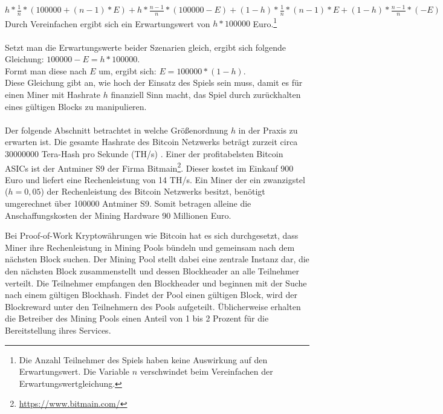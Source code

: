 $h*\frac{1}{n}*(100000 + (n-1)*E) + h*\frac{n-1}{n}*(100000 - E) + (1-h)*\frac{1}{n}*(n-1)*E + (1-h)*\frac{n-1}{n}* (-E)$\\
Durch Vereinfachen ergibt sich ein Erwartungswert von $ h*100000$ Euro.\footnote{Die Anzahl Teilnehmer des Spiels haben keine Auswirkung auf den Erwartungswert. Die Variable $n$ verschwindet beim Vereinfachen der Erwartungswertgleichung.}\\\\
Setzt man die Erwartungswerte beider Szenarien gleich, ergibt sich folgende Gleichung: $100000 - E = h*100000$.\\Formt man diese nach $E$ um, ergibt sich: $E = 100000 * (1-h)$.\\
Diese Gleichung gibt an, wie hoch der Einsatz des Spiels sein muss, damit es für einen Miner mit Hashrate $h$ finanziell Sinn macht, das Spiel durch zurückhalten eines gültigen Blocks zu manipulieren.\\\\
Der folgende Abschnitt betrachtet in welche Größenordnung $h$ in der Praxis zu erwarten ist.
Die gesamte Hashrate des Bitcoin Netzwerks beträgt zurzeit circa 30000000 Tera-Hash pro Sekunde (TH/s) \cite{blockchain_info_hashrate}. Einer der profitabelsten Bitcoin ASICs ist der Antminer S9 der Firma Bitmain\footnote{\url{https://www.bitmain.com/}}. Dieser kostet im Einkauf 900 Euro und liefert eine Rechenleistung von 14 TH/s. Ein Miner der ein zwanzigstel ($h=0,05$) der Rechenleistung des Bitcoin Netzwerks besitzt, benötigt umgerechnet über 100000 Antminer S9. Somit betragen alleine die Anschaffungskosten der Mining Hardware 90 Millionen Euro.

Bei Proof-of-Work Kryptowährungen wie Bitcoin hat es sich durchgesetzt, dass Miner ihre Rechenleistung in Mining Pools bündeln und gemeinsam nach dem nächsten Block suchen. Der Mining Pool stellt dabei eine zentrale Instanz dar, die den nächsten Block zusammenstellt und dessen Blockheader an alle Teilnehmer verteilt. Die Teilnehmer empfangen den Blockheader und beginnen mit der Suche nach einem gültigen Blockhash. Findet der Pool einen gültigen Block, wird der Blockreward unter den Teilnehmern des Pools aufgeteilt. Üblicherweise erhalten die Betreiber des Mining Pools einen Anteil von 1 bis 2 Prozent für die Bereitstellung ihres Services.

